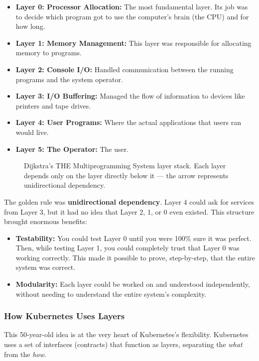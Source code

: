 \begin{itemize}
\item \textbf{Layer 0: Processor Allocation:} The most fundamental layer. Its job was to decide which program got to use the computer's brain (the CPU) and for how long.
\item \textbf{Layer 1: Memory Management:} This layer was responsible for allocating memory to programs.
\item \textbf{Layer 2: Console I/O:} Handled communication between the running programs and the system operator.
\item \textbf{Layer 3: I/O Buffering:} Managed the flow of information to devices like printers and tape drives.
\item \textbf{Layer 4: User Programs:} Where the actual applications that users ran would live.
\item \textbf{Layer 5: The Operator:} The user.
\end{itemize}
\begin{figure}[htbp]
\centering

\caption{Dijkstra's THE Multiprogramming System layer stack. Each layer depends only on the layer directly below it --- the arrow represents unidirectional dependency.}
\label{fig:1_1}
\end{figure}



The golden rule was \textbf{unidirectional dependency}. Layer 4 could ask for services from Layer 3, but it had no idea that Layer 2, 1, or 0 even existed. This structure brought enormous benefits:

\begin{itemize}
\item \textbf{Testability:} You could test Layer 0 until you were 100\% sure it was perfect. Then, while testing Layer 1, you could completely trust that Layer 0 was working correctly. This made it possible to prove, step-by-step, that the entire system was correct.
\item \textbf{Modularity:} Each layer could be worked on and understood independently, without needing to understand the entire system's complexity.
\end{itemize}

\subsubsection{\textbf{How Kubernetes Uses Layers}}


This 50-year-old idea is at the very heart of Kubernetes's flexibility. Kubernetes uses a set of interfaces (contracts) that function as layers, separating the \textit{what} from the \textit{how}.

